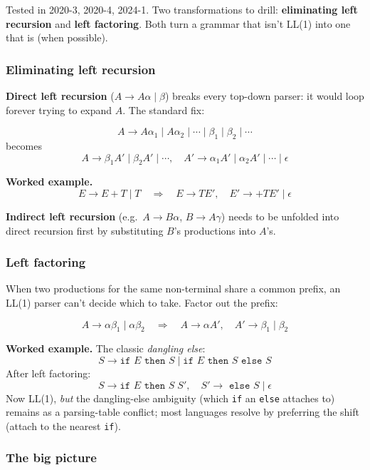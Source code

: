 \documentclass[11pt,a4paper]{article}
\begin{document}
\begin{must}
Tested in 2020-3, 2020-4, 2024-1. Two transformations to drill: \textbf{eliminating left recursion} and \textbf{left factoring}. Both turn a grammar that isn't LL(1) into one that is (when possible).
\end{must}

\subsubsection*{Eliminating left recursion}

\textbf{Direct left recursion} ($A \to A\alpha \mid \beta$) breaks every top-down parser: it would loop forever trying to expand $A$. The standard fix:

$$A \to A\alpha_1 \mid A\alpha_2 \mid \cdots \mid \beta_1 \mid \beta_2 \mid \cdots$$
becomes
$$A \to \beta_1 A' \mid \beta_2 A' \mid \cdots, \quad A' \to \alpha_1 A' \mid \alpha_2 A' \mid \cdots \mid \epsilon$$

\textbf{Worked example.}
$$E \to E + T \mid T \quad\Longrightarrow\quad E \to T E', \quad E' \to {+} T E' \mid \epsilon$$

\textbf{Indirect left recursion} (e.g.\ $A \to B\alpha$, $B \to A\gamma$) needs to be unfolded into direct recursion first by substituting $B$'s productions into $A$'s.

\subsubsection*{Left factoring}

When two productions for the same non-terminal share a common prefix, an LL(1) parser can't decide which to take. Factor out the prefix:

$$A \to \alpha\beta_1 \mid \alpha\beta_2 \quad\Longrightarrow\quad A \to \alpha A', \quad A' \to \beta_1 \mid \beta_2$$

\textbf{Worked example.} The classic \emph{dangling else}:
$$S \to \texttt{if } E \texttt{ then } S \mid \texttt{if } E \texttt{ then } S \texttt{ else } S$$
After left factoring:
$$S \to \texttt{if } E \texttt{ then } S \; S', \quad S' \to \texttt{ else } S \mid \epsilon$$
Now LL(1), \emph{but} the dangling-else ambiguity (which \texttt{if} an \texttt{else} attaches to) remains as a parsing-table conflict; most languages resolve by preferring the shift (attach to the nearest \texttt{if}).

\subsubsection*{The big picture}
\end{document}
